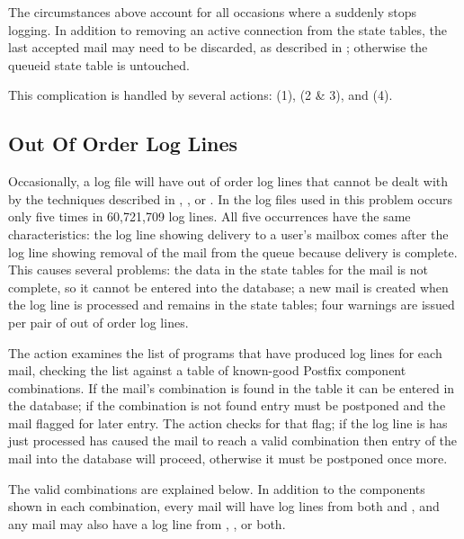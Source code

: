 The circumstances above account for all occasions where a 
suddenly stops logging.  In addition to removing an active connection from
the state tables, the last accepted mail may need to be discarded, as
described in ; otherwise the queueid
state table is untouched.

This complication is handled by several actions:  (1),
 (2 \& 3), and  (4).


\subsection{Out Of Order Log Lines}

\label{out of order log lines}

Occasionally, a log file will have out of order log lines that cannot be
dealt with by the techniques described in , , or .  In the \numberOFlogFILES{} log files used in
 this problem occurs only five times in 60,721,709
log lines.  All five occurrences have the same characteristics: the
 log line showing delivery to a user's mailbox comes after
the  log line showing removal of the mail from the queue
because delivery is complete.  This causes several problems: the data in
the state tables for the mail is not complete, so it cannot be entered into
the database; a new mail is created when the  log line is
processed and remains in the state tables; four warnings are issued per
pair of out of order log lines.

The  action examines the list of programs that have produced
log lines for each mail, checking the list against a table of known-good
Postfix component combinations.  If the mail's combination is found in the
table it can be entered in the database; if the combination is not found
entry must be postponed and the mail flagged for later entry.  The
 action checks for that flag; if the log line is
has just processed has caused the mail to reach a valid combination then
entry of the mail into the database will proceed, otherwise it must be
postponed once more.

The valid combinations are explained below.  In addition to the components
shown in each combination, every mail will have log lines from both
 and , and any mail may also have a log line
from , , or both.


